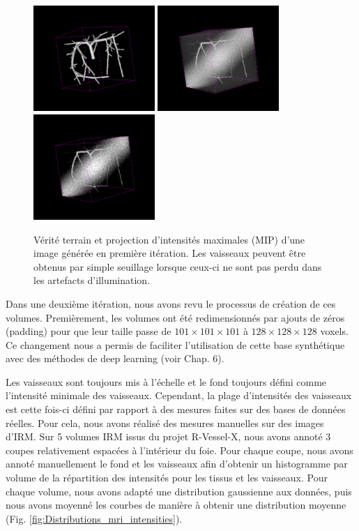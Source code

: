 \begin{figure}[!ht]
  \centering
  \includegraphics[height=4cm]{Images/vascu_v1_gt.png}
  \includegraphics[height=4cm]{Images/vascu_v1_original.png}
  \includegraphics[height=4cm]{Images/vascu_v1_thresholding.png}
  \caption{Vérité terrain et projection d'intensités maximales (MIP) d'une image générée en première itération. Les vaisseaux peuvent être obtenus par simple seuillage lorsque ceux-ci ne sont pas perdu dans les artefacts d'illumination.}
  \label{fig:vascu_v1_problems}
\end{figure}

Dans une deuxième itération, nous avons revu le processus de création de ces volumes. Premièrement, les volumes ont été redimensionnés par ajouts de zéros (padding) pour que leur taille passe de $101 \times 101 \times 101$ à $128 \times 128 \times 128$ voxels. Ce changement nous a permis de faciliter l'utilisation de cette base synthétique avec des méthodes de deep learning (voir Chap. 6).

Les vaisseaux sont toujours mis à l'échelle et le fond toujours défini comme l'intensité minimale des vaisseaux. Cependant, la plage d'intensités des vaisseaux est cette fois-ci défini par rapport à des mesures faites sur des bases de données réelles. Pour cela, nous avons réalisé des mesures manuelles sur des images d'IRM. Sur 5 volumes IRM issus du projet R-Vessel-X, nous avons annoté 3 coupes relativement espacées à l'intérieur du foie. Pour chaque coupe, nous avons annoté manuellement le fond et les vaisseaux afin d'obtenir un histogramme par volume de la répartition des intensités pour les tissus et les vaisseaux. Pour chaque volume, nous avons adapté une distribution gaussienne aux données, puis nous avons moyenné les courbes de manière à obtenir une distribution moyenne (Fig. \ref{fig:Distributions_mri_intensities}).

